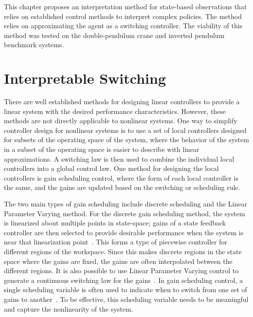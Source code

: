 This chapter proposes an interpretation method for state-based observations that relies on established control methods to interpret complex policies. The method relies on approximating the agent as a switching controller. The viability of this method was tested on the double-pendulum crane and inverted pendulum benchmark systems.

\section{Interpretable Switching}

There are well established methods for designing linear controllers to provide a linear system with the desired performance characteristics. However, these methods are not directly applicable to nonlinear systems.
One way to simplify controller design for nonlinear systems is to use a set of local controllers designed for subsets of the operating space of the system, where the behavior of the system in a subset of the operating space is easier to describe with linear approximations.
%
%
A switching law is then used to combine the individual local controllers into a global control law.
%
One method for designing the local controllers is gain scheduling control, where the form of each local controller is the same, and the gains are updated based on the switching or scheduling rule.
%

The two main types of gain scheduling include discrete scheduling and the Linear Parameter Varying method. For the discrete gain scheduling method, the system is linearized about multiple points in state-space; gains of a state feedback controller are then selected to provide desirable performance when the system is near that linearization point~\cite{Hyde:1993a,Leith:2000a}. This forms a type of piecewise controller for different regions of the workspace. Since this makes discrete regions in the state space where the gains are fixed, the gains are often interpolated between the different regions. It is also possible to use Linear Parameter Varying control to generate a continuous switching law for the gains~\cite{Rugh:2000a,Hoffmann:2015a}.
%
In gain scheduling control, a single scheduling variable is often used to indicate when to switch from one set of gains to another~\cite{Shamma:1990a}. To be effective, this scheduling variable needs to be meaningful and capture the nonlinearity of the system. 

